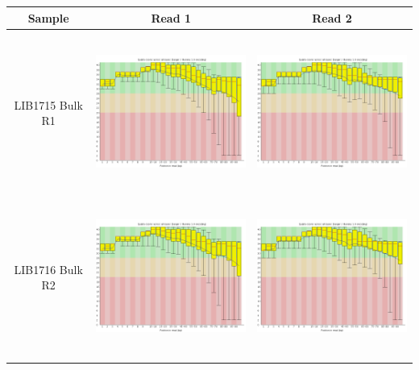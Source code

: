 \begin{center}
\begin{tabular}{ccc}
\toprule
Sample  & Read 1 & Read 2 \\ \midrule 
\\
\begin{sideways}LIB1715 Bulk R1\end{sideways} & \includegraphics[height=5cm]{Appendices/images/Sample_LIB1715_base_quality_R1.png} & \includegraphics[height=5cm]{Appendices/images/Sample_LIB1715_base_quality_R2.png} \\ \midrule  \\
\begin{sideways}LIB1716 Bulk R2\end{sideways} & \includegraphics[height=5cm]{Appendices/images/Sample_LIB1716_base_quality_R1.png} & \includegraphics[height=5cm]{Appendices/images/Sample_LIB1716_base_quality_R2.png} \\ \midrule  \\

\end{tabular}
\end{center}
